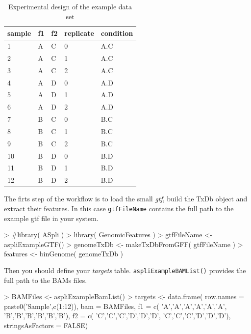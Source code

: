 \documentclass{article}
\begin{document}
\begin{table}[H]
  \begin{center}
    \begin{tabular}{lllll}
    sample   & f1 & f2 & replicate & condition \\ \hline
    1        & A  & C  & 0         & A.C       \\
    2        & A  & C  & 1         & A.C       \\
    3        & A  & C  & 2         & A.C       \\
    4        & A  & D  & 0         & A.D       \\
    5        & A  & D  & 1         & A.D       \\
    6        & A  & D  & 2         & A.D       \\
    7        & B  & C  & 0         & B.C       \\
    8        & B  & C  & 1         & B.C       \\
    9        & B  & C  & 2         & B.C       \\
    10       & B  & D  & 0         & B.D       \\
    11       & B  & D  & 1         & B.D       \\
    12       & B  & D  & 2         & B.D       \\
    \end{tabular}
  \end{center}
  \caption{Experimental design of the example data set}
  \label{tab:Ex01}
\end{table}

The firts step of the workflow is to load the small {\em gtf}, build the TxDb object and extract their features. In this case \texttt{gtfFileName} contains the full path to the example gtf file in your system.

\begin{Schunk}
\begin{Sinput}
> #library( ASpli )
> library( GenomicFeatures )
> gtfFileName <- aspliExampleGTF()
> genomeTxDb <- makeTxDbFromGFF( gtfFileName )
> features <- binGenome( genomeTxDb )
\end{Sinput}
\end{Schunk}

Then you should define your {\em targets} table.
\texttt{aspliExampleBAMList()} provides the full path to the BAMs files.

\begin{Schunk}
\begin{Sinput}
> BAMFiles <- aspliExampleBamList()
> targets <- data.frame( 
   row.names = paste0('Sample',c(1:12)),
   bam = BAMFiles,
   f1 = c( 'A','A','A','A','A','A',
           'B','B','B','B','B','B'),
   f2 = c( 'C','C','C','D','D','D',
           'C','C','C','D','D','D'),
   stringsAsFactors = FALSE)
\end{Sinput}
\end{Schunk}
\end{document}
